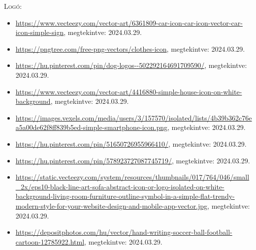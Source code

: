 \documentclass[]{thesis-ekf}
\theoremstyle{definition}
\theoremstyle{remark}
\begin{document}
\begin{thebibliography}{2}
		\textsc{Logó}:
			\begin{itemize}
				\item \url{https://www.vecteezy.com/vector-art/6361809-car-icon-car-icon-vector-car-icon-simple-sign},  megtekintve: 2024.03.29.
				\item \url{https://pngtree.com/free-png-vectors/clothes-icon}, megtekintve: 2024.03.29.
				\item \url{https://hu.pinterest.com/pin/dog-logos--502292164691709590/}, megtekintve: 2024.03.29.
				\item \url{https://www.vecteezy.com/vector-art/4416880-simple-house-icon-on-white-background}, megtekintve: 2024.03.29.
				\item \url{https://images.vexels.com/media/users/3/157570/isolated/lists/4b39b362c76ea5a00de62f8ff839b5ed-simple-smartphone-icon.png}, megtekintve: 2024.03.29.
				\item \url{https://hu.pinterest.com/pin/51650726955966410/}, megtekintve: 2024.03.29.
				\item \url{https://hu.pinterest.com/pin/578923727087745719/}, megtekintve: 2024.03.29.
				\item \url{https://static.vecteezy.com/system/resources/thumbnails/017/764/046/small_2x/eps10-black-line-art-sofa-abstract-icon-or-logo-isolated-on-white-background-living-room-furniture-outline-symbol-in-a-simple-flat-trendy-modern-style-for-your-website-design-and-mobile-app-vector.jpg}, megtekintve: 2024.03.29.
				\item \url{https://depositphotos.com/hu/vector/hand-writing-soccer-ball-football-cartoon-12785922.html}, megtekintve: 2024.03.29.
			
			\end{itemize}
		
		
	\end{thebibliography}
	
	
\end{document}
